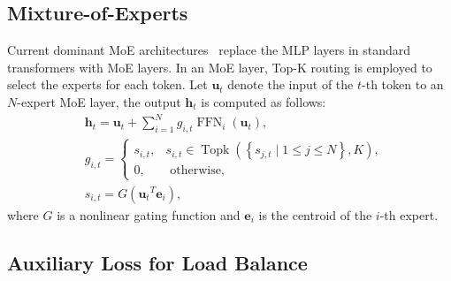 \documentclass{article} %
\begin{document}
\subsection{Mixture-of-Experts} Current dominant MoE architectures~\citep{Lepikhin2020GShardSG,Fedus2021SwitchTS,Dai2024DeepSeekMoETU} replace the MLP layers in standard transformers with MoE layers. In an MoE layer, Top-K routing is employed to select the experts for each token. Let $\mathbf{u}_t$ denote the input of the $t$-th token to an $N$-expert MoE layer, the output $\mathbf{h}_t$ is computed as follows:
\begin{equation}
\begin{aligned}
& \mathbf{h}_t=\mathbf{u}_t+\sum_{i=1}^{N} g_{i, t} \operatorname{FFN}_i\left(\mathbf{u}_t\right), \\
& g_{i, t}= \begin{cases}s_{i, t}, & s_{i, t} \in \operatorname{Topk}\left(\left\{s_{j, t} \mid 1 \leq j \leq N\right\}, K\right), \\
0, & \text { otherwise, }\end{cases} \\
& s_{i, t}=G\left(\mathbf{u}_t{ }^T \mathbf{e}_i\right),
\end{aligned} 
\end{equation}
where $G$ is a nonlinear gating function and $ \mathbf{e}_i$ is the centroid of the $i$-th expert.



\subsection{Auxiliary Loss for Load Balance}
\label{sec:aux_loss}
\end{document}
